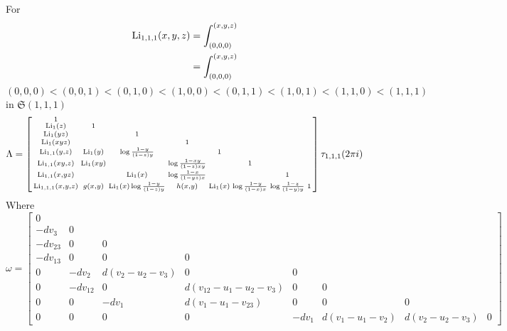 \documentclass[main]{subfiles}
\begin{document}
\begin{example}
For
\begin{align*}
\operatorname{Li}_{1,1,1}(x,y,z)&=\int_{(0,0,0)}^{(x,y,z)} \\
&=\int_{(0,0,0)}^{(x,y,z)}
\end{align*}
$(0,0,0)<(0,0,1)<(0,1,0)<(1,0,0)<(0,1,1)<(1,0,1)<(1,1,0)<(1,1,1)$ in $\mathfrak S(1,1,1)$
\[\Lambda=\left[\begin{smallmatrix}
1&&&&&&&\\
\operatorname{Li}_{1}(z)&1&&&&&&\\
\operatorname{Li}_{1}(yz)&&1&&&&&\\
\operatorname{Li}_{1}(xyz)&&&1&&&&\\
\operatorname{Li}_{1,1}(y,z)&\operatorname{Li}_1(y)&\log\frac{1-y}{(1-z)y}&&1&&&\\
\operatorname{Li}_{1,1}(xy,z)&\operatorname{Li}_1(xy)&&\log\frac{1-xy}{(1-z)xy}&&1&&\\
\operatorname{Li}_{1,1}(x,yz)&&\operatorname{Li}_1(x)&\log\frac{1-x}{(1-yz)x}&&&1&\\
\operatorname{Li}_{1,1,1}(x,y,z)&g(x,y)&\operatorname{Li}_1(x)\log\frac{1-y}{(1-z)y}&h(x,y)&\operatorname{Li}_1(x)&\log\frac{1-y}{(1-x)x}&\log\frac{1-z}{(1-y)y}&1
\end{smallmatrix}\right]\tau_{1,1,1}(2\pi i)\]
Where
\[\omega=\left[\begin{smallmatrix}
0\\
-dv_3&0\\
-dv_{23}&0&0\\
-dv_{13}&0&0&0\\
0&-dv_2&d(v_2-u_2-v_3)&0&0\\
0&-dv_{12}&0&d(v_{12}-u_1-u_2-v_3)&0&0\\
0&0&-dv_1&d(v_1-u_1-v_{23})&0&0&0\\
0&0&0&0&-dv_1&d(v_1-u_1-v_2)&d(v_2-u_2-v_3)&0
\end{smallmatrix}\right]\]
\end{example}
\end{document}
